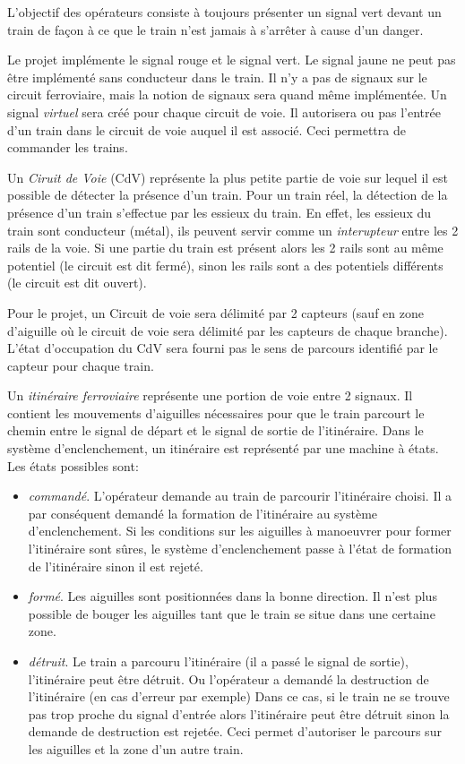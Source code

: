 L'objectif des opérateurs consiste à toujours présenter un signal vert devant un train de façon 
à ce que le train n'est jamais à s'arrêter à cause d'un danger.


\medskip
Le projet implémente le signal rouge et le signal vert. Le signal jaune ne peut pas être implémenté sans conducteur 
dans le train. Il n'y a pas de signaux sur le circuit ferroviaire, mais la notion de signaux sera quand même
implémentée. Un signal \emph{virtuel} sera créé pour chaque circuit de voie. Il autorisera ou pas l'entrée d'un train dans 
le circuit de voie auquel il est associé.
Ceci permettra de commander les trains. 

\medskip
Un \emph{Ciruit de Voie} (CdV) représente la plus petite partie de voie sur lequel il
est possible de détecter la présence d'un train. Pour un train réel, la détection de la 
présence d'un train s'effectue par les essieux du train. En effet, les essieux du train sont conducteur
(métal), ils peuvent servir comme un \emph{interupteur} entre les 2 rails de la voie. Si une partie du 
train est présent alors les 2 rails sont au même potentiel (le circuit est dit fermé), sinon les rails sont 
a des potentiels différents (le circuit est dit ouvert). 

\medskip
Pour le projet, un Circuit de voie sera délimité par 2 capteurs (sauf en zone d'aiguille où le circuit de voie sera 
délimité par les capteurs de chaque branche). L'état d'occupation du CdV sera fourni pas le sens de parcours 
identifié par le capteur pour chaque train.

\medskip
Un \emph{itinéraire ferroviaire} représente une portion de voie entre 2 signaux. Il contient les mouvements
d’aiguilles nécessaires pour que le train parcourt le chemin entre le signal de
départ et le signal de sortie de l'itinéraire. Dans le système d'enclenchement, un itinéraire
est représenté par une machine à états. Les états possibles sont:
\begin{itemize}
\item \emph{commandé}. L’opérateur demande au train de parcourir l’itinéraire
choisi. Il a par conséquent demandé la formation de l’itinéraire au
système d’enclenchement. Si les conditions sur les aiguilles à manoeuvrer
pour former l’itinéraire sont sûres, le système d’enclenchement
passe à l’état de formation de l’itinéraire sinon il est rejeté.
\item \emph{formé}. Les aiguilles sont positionnées dans la bonne direction. Il n’est
plus possible de bouger les aiguilles tant que le train se situe dans une
certaine zone.
\item \emph{détruit}. Le train a parcouru l’itinéraire (il a passé le signal de sortie), l'itinéraire peut
 être détruit. Ou l'opérateur a demandé la destruction de l'itinéraire (en cas d'erreur par exemple)
Dans ce cas, si le train ne se trouve pas trop proche du signal d'entrée alors l'itinéraire peut 
être détruit sinon la demande de destruction est rejetée. 
Ceci permet d'autoriser le parcours sur les aiguilles et la zone d’un autre train. 
\end{itemize}


